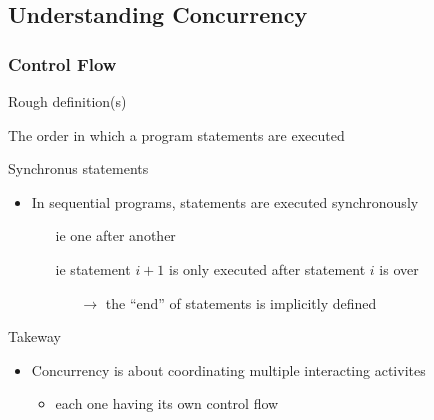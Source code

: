 \documentclass{beamer}\mode<presentation>{\usetheme{AMSBolognaFC}}
\begin{document}
\subsection{Understanding Concurrency}

\begin{frame}[allowframebreaks]
    \frametitle{Control Flow}

    \begin{block}{Rough definition(s)}
        \begin{center}
            The order in which a program statements are executed
        \end{center}
    \end{block}

    \begin{block}{Synchronus statements}
        \begin{itemize}
            \item In sequential programs, statements are executed \alert{synchronously}
            \begin{itemize}
                \item[ie] one after another
                \item[ie] statement $i+1$ is only executed after statement $i$ is over
                \begin{itemize}
                    \item[$\rightarrow$] the ``end'' of statements is implicitly defined
                \end{itemize}
            \end{itemize}
        \end{itemize}
    \end{block}

    




    \begin{alertblock}{Takeway}
        \begin{itemize}
            \item Concurrency is about \alert{coordinating} multiple interacting activites
            \begin{itemize}
                \item each one having its own control flow
            \end{itemize}
        \end{itemize}
    \end{alertblock}


\end{frame}
\end{document}
